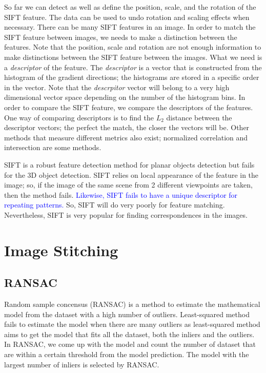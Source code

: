 \documentclass{report}
\begin{document}
So far we can detect as well as define the position, scale, and the rotation of the SIFT feature. The data can be used to undo rotation and scaling effects when necessary. There can be many SIFT features in an image. In order to match the SIFT feature between images, we needs to make a distinction between the features. Note that the position, scale and rotation are not enough information to make distinctions between the SIFT feature between the images. What we need is a \textit{descriptor} of the feature. The \textit{descriptor} is a vector that is constructed from the histogram of the gradient directions; the histograms are stored in a specific order in the vector. Note that the \textit{descrpitor} vector will belong to a very high dimensional vector space depending on the number of the histogram bins. In order to compare the SIFT feature, we compare the descriptors of the features. One way of comparing descriptors is to find the $L_2$ distance between the descriptor vectors; the perfect the match, the closer the vectors will be. Other methods that measure different metrics also exist; normalized correlation and intersection are some methods.

SIFT is a robust feature detection method for planar objects detection but fails for the $3$D object detection. SIFT relies on local appearance of the feature in the image; so, if the image of the same scene from 2 different viewpoints are taken, then the method fails. \textcolor{blue}{Likewise, SIFT fails to have a unique descriptor for repeating patterns.} So, SIFT will do very poorly for feature matching. Nevertheless, SIFT is very popular for finding correspondences in the images.

\section{Image Stitching}
\label{section:ImageStitching}
\subsection{RANSAC}
\hspace{\parindent}Random sample concensus (RANSAC) is a method to estimate the mathematical model from the dataset with a high number of outliers. Least-squared method fails to estimate the model when there are many outliers as least-squared method aims to get the model that fits all the dataset, both the inliers and the outliers. In RANSAC, we come up with the model and count the number of dataset that are within a certain threshold from the model prediction. The model with the largest number of inliers is selected by RANSAC.
\end{document}
